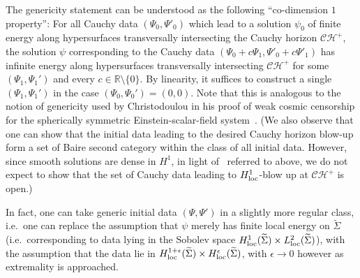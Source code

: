 \documentclass[A4,10pt]{article}
\begin{document}
The genericity statement can be understood as the following ``co-dimension $1$ property'': %
For all Cauchy data $\left(\Psi_0,\Psi'_0\right)$ which lead to a solution $\psi_0$ of finite energy along hypersurfaces transversally intersecting the Cauchy horizon $\mathcal{CH}^+$, the solution $\psi$ corresponding to the Cauchy data $\left(\Psi_0 + c\Psi_1,\Psi'_0 + c\Psi'_1\right)$ has infinite energy along hypersurfaces transversally intersecting $\mathcal{CH}^+$ for some $\left(\Psi_1,\Psi_1'\right)$ and every $c\in \mathbb{R}\setminus\{0\}$. By linearity, it suffices to construct a single $\left(\Psi_1,\Psi_1'\right)$ in the case  $\left(\Psi_0,\Psi_0'\right) = (0,0)$. Note that this is analogous to the notion of genericity used by Christodoulou in his proof of weak cosmic censorship for the spherically symmetric Einstein-scalar-field system~\cite{Christodoulou4,Chrmil}. (We also observe that one can show that the initial data leading to the desired Cauchy horizon blow-up form a set of Baire second category within the class of all initial data. However, since smooth solutions are dense in $H^1$, in light of~\cite{Dafermos2014, HarveyPhy,cardosoetal} referred to above, we do not expect to show that the set of Cauchy data leading to $H^1_{\rm loc}$-blow up at $\mathcal{CH}^+$ is open.)

In fact, one can take generic initial data $(\Psi, \Psi')$ in a slightly more regular class,
i.e.~one can replace the assumption that  $\psi$ merely has finite local energy on $\widetilde{\Sigma}$ (i.e.~corresponding to data lying in the Sobolev space
$H^1_{\rm loc}(\widetilde{\Sigma})\times L^2_{\rm loc}(\widetilde{\Sigma})$), 
with the assumption that the data lie in
$H^{1+\epsilon}_{\rm loc}(\widetilde{\Sigma})\times H^\epsilon_{\rm loc}(\widetilde{\Sigma})$,
with $\epsilon\to 0$ however as extremality is approached.
\end{document}
